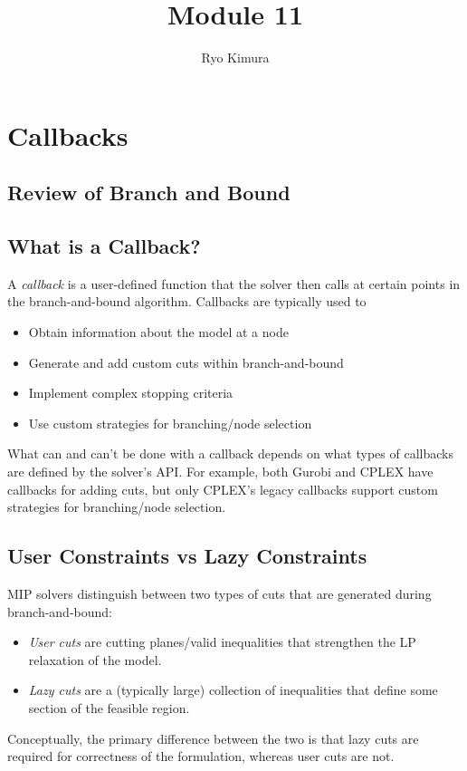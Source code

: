 \documentclass[12pt]{article}
\begin{document}
\title{Module 11}
\author{Ryo Kimura}
\date{}
\maketitle

\section{Callbacks}
\subsection{Review of Branch and Bound}

\subsection{What is a Callback?}
A \emph{callback} is a user-defined function that the solver then calls at certain points in the branch-and-bound algorithm. Callbacks are typically used to
\begin{itemize}
    \item Obtain information about the model at a node
    \item Generate and add custom cuts within branch-and-bound
    \item Implement complex stopping criteria
    \item Use custom strategies for branching/node selection
\end{itemize}

What can and can't be done with a callback depends on what types of callbacks are defined by the solver's API. For example, both Gurobi and CPLEX have callbacks for adding cuts, but only CPLEX's legacy callbacks support custom strategies for branching/node selection.

\subsection{User Constraints vs Lazy Constraints}
MIP solvers distinguish between two types of cuts that are generated during branch-and-bound:
\begin{itemize}
    \item \emph{User cuts} are cutting planes/valid inequalities that strengthen the LP relaxation of the model.
    \item \emph{Lazy cuts} are a (typically large) collection of inequalities that define some section of the feasible region.
\end{itemize}
Conceptually, the primary difference between the two is that lazy cuts are required for correctness of the formulation, whereas user cuts are not.
\end{document}
